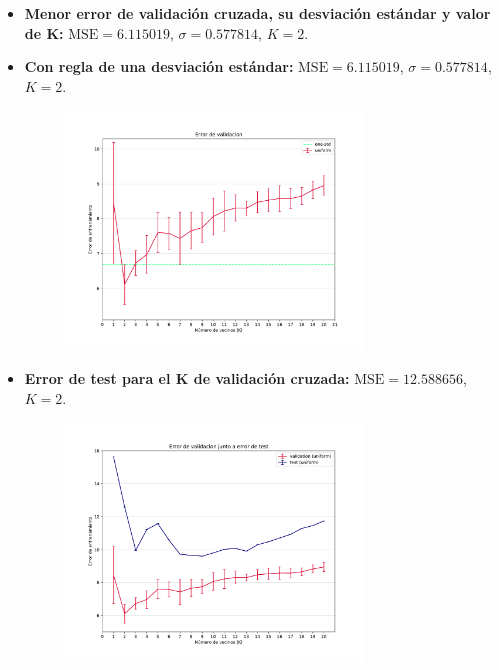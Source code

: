\documentclass[11pt]{article}
\begin{document}
\begin{itemize}
    \item \textbf{Menor error de validación cruzada, su desviación estándar y valor de K:} $\text{MSE} = 6.115019$, $\sigma = 0.577814$, $K = 2$.
    \item \textbf{Con regla de una desviación estándar:} $\text{MSE} = 6.115019$, $\sigma = 0.577814$, $K = 2$.
    \begin{figure}[H]
    \centering
    \includegraphics[width=0.75\textwidth]{fotos/ej3_1.pdf}
    \end{figure}
    \item \textbf{Error de test para el K de validación cruzada:} $\text{MSE} = 12.588656$, $K = 2$.
    \begin{figure}[H]
    \centering
    \includegraphics[width=0.75\textwidth]{fotos/ej3_2.pdf}
    \end{figure}
\end{itemize}
\end{document}
